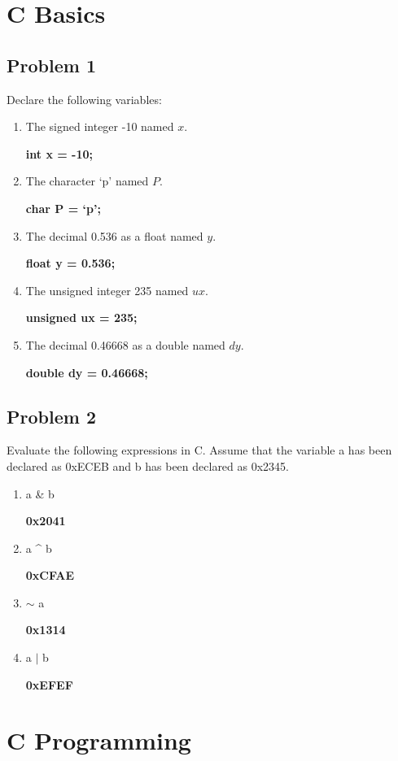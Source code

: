 \documentclass{article}
\begin{document}
\section*{C Basics} 
\subsection*{Problem 1}
    Declare the following variables:
        \begin{enumerate}[label=\alph*.]
            \item The signed integer -10 named $x$.

            \textbf{int x = -10;}
            \item The character `p' named $P$.

            \textbf{char P = `p';}
            \item The decimal 0.536 as a float named $y$.

            \textbf{float y = 0.536;}
            \item The unsigned integer 235 named $ux$.

            \textbf{unsigned ux = 235;}
            \item The decimal 0.46668 as a double named $dy$.

            \textbf{double dy = 0.46668;}
        \end{enumerate}
\subsection*{Problem 2}
    Evaluate the following expressions in C. Assume that the variable a has been declared as 0xECEB and b has been declared as 0x2345.
        \begin{enumerate}[label=\alph*.]
            \item a \& b

            \textbf{0x2041}
            \item a \^{} b

            \textbf{0xCFAE}
            \item $\sim$ a

            \textbf{0x1314}
            \item a $\mid$ b

            \textbf{0xEFEF}
        \end{enumerate}

\section*{C Programming}
\end{document}
